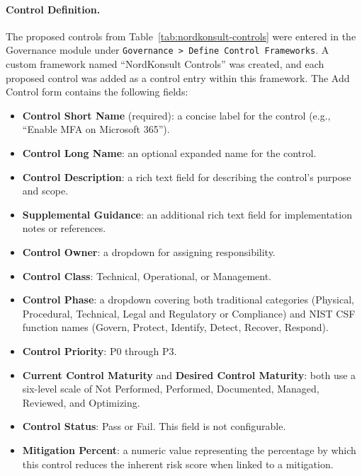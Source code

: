 
\paragraph{Control Definition.}
The proposed controls from Table~\ref{tab:nordkonsult-controls} were entered in the
Governance module under \texttt{Governance > Define Control Frameworks}. A custom
framework named ``NordKonsult Controls'' was created, and each proposed control was
added as a control entry within this framework. The Add Control form contains the
following fields:
 
\begin{itemize}
    \item \textbf{Control Short Name} (required): a concise label for the control
          (e.g., ``Enable MFA on Microsoft 365'').
    \item \textbf{Control Long Name}: an optional expanded name for the control.
    \item \textbf{Control Description}: a rich text field for describing the control's
          purpose and scope.
    \item \textbf{Supplemental Guidance}: an additional rich text field for
          implementation notes or references.
    \item \textbf{Control Owner}: a dropdown for assigning responsibility.
    \item \textbf{Control Class}: Technical, Operational, or Management.
    \item \textbf{Control Phase}: a dropdown covering both traditional categories
          (Physical, Procedural, Technical, Legal and Regulatory or Compliance) and
          NIST CSF function names (Govern, Protect, Identify, Detect, Recover, Respond).
    \item \textbf{Control Priority}: P0 through P3.
    \item \textbf{Current Control Maturity} and \textbf{Desired Control Maturity}:
          both use a six-level scale of Not Performed, Performed, Documented, Managed,
          Reviewed, and Optimizing.
    \item \textbf{Control Status}: Pass or Fail. This field is not configurable.
    \item \textbf{Mitigation Percent}: a numeric value representing the percentage by
          which this control reduces the inherent risk score when linked to a mitigation.

\end{itemize}
